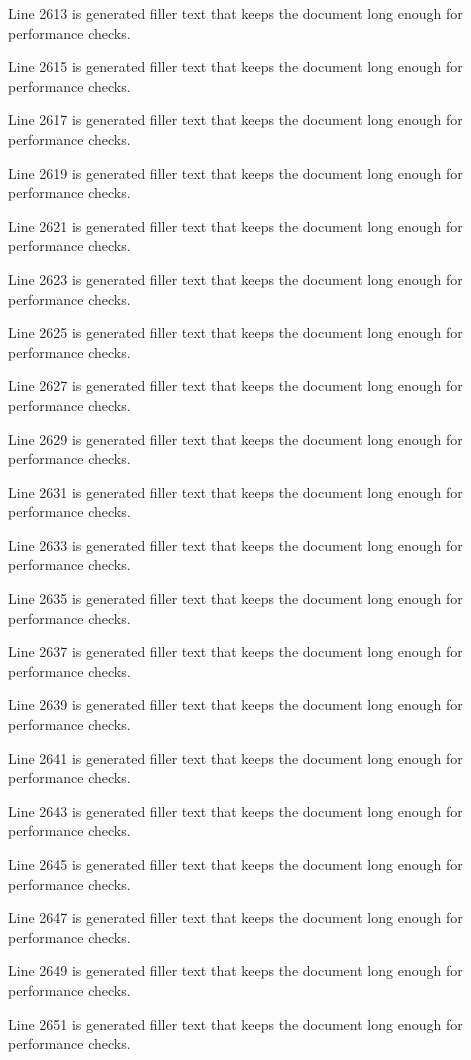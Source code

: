 Line 2613 is generated filler text that keeps the document long enough for performance checks.

Line 2615 is generated filler text that keeps the document long enough for performance checks.

Line 2617 is generated filler text that keeps the document long enough for performance checks.

Line 2619 is generated filler text that keeps the document long enough for performance checks.

Line 2621 is generated filler text that keeps the document long enough for performance checks.

Line 2623 is generated filler text that keeps the document long enough for performance checks.

Line 2625 is generated filler text that keeps the document long enough for performance checks.

Line 2627 is generated filler text that keeps the document long enough for performance checks.

Line 2629 is generated filler text that keeps the document long enough for performance checks.

Line 2631 is generated filler text that keeps the document long enough for performance checks.

Line 2633 is generated filler text that keeps the document long enough for performance checks.

Line 2635 is generated filler text that keeps the document long enough for performance checks.

Line 2637 is generated filler text that keeps the document long enough for performance checks.

Line 2639 is generated filler text that keeps the document long enough for performance checks.

Line 2641 is generated filler text that keeps the document long enough for performance checks.

Line 2643 is generated filler text that keeps the document long enough for performance checks.

Line 2645 is generated filler text that keeps the document long enough for performance checks.

Line 2647 is generated filler text that keeps the document long enough for performance checks.

Line 2649 is generated filler text that keeps the document long enough for performance checks.

Line 2651 is generated filler text that keeps the document long enough for performance checks.

